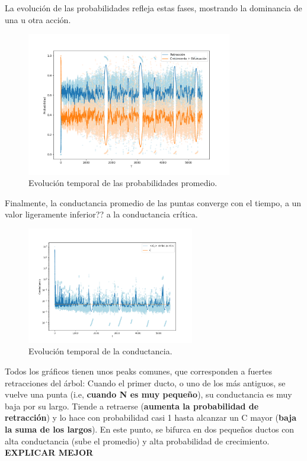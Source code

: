 \documentclass{article}
\begin{document}
\newpage

La evolución de las probabilidades refleja estas fases, mostrando la dominancia de una u otra acción.

\begin{figure}[h!]
    \centering
    \includegraphics[width=0.8\textwidth]{graficos_inst/probs_vs_tiempo.png}
    \caption{Evolución temporal de las probabilidades promedio.}
    \label{fig:evolucion_probabilidades}
\end{figure}

Finalmente, la conductancia promedio de las puntas converge con el tiempo, a un valor ligeramente inferior?? a la conductancia crítica.

\begin{figure}[h!]
    \centering
    \includegraphics[width=0.65\textwidth]{graficos_inst/Cij_vs_tiempo.png}
    \caption{Evolución temporal de la conductancia.}
    \label{fig:evolucion_conductancia}
\end{figure}
\newpage

Todos los gráficos tienen unos peaks comunes, que corresponden a fuertes retracciones del árbol:
Cuando el primer ducto, o uno de los más antiguos, se vuelve una punta (i.e, \textbf{cuando N es muy pequeño}), su conductancia es muy baja por su largo.
Tiende a retraerse (\textbf{aumenta la probabilidad de retracción}) y lo hace con probabilidad casi 1 hasta alcanzar un C mayor (\textbf{baja la suma de los largos}).
En este punto, se bifurca en dos pequeños ductos con alta conductancia (sube el promedio) y alta probabilidad de crecimiento. \large\textbf{EXPLICAR MEJOR}
\end{document}
